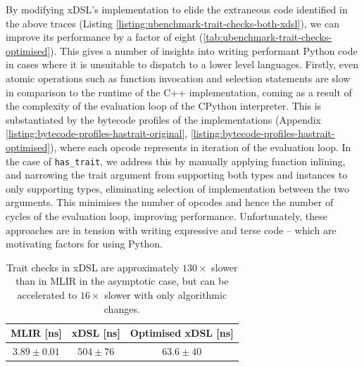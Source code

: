 By modifying xDSL's implementation to elide the extraneous code identified in the above traces (Listing \ref{listing:ubenchmark-trait-checks-both-xdsl}), we can improve its performance by a factor of eight (\autoref{tab:ubenchmark-trait-checks-optimised}).
This gives a number of insights into writing performant Python code in cases where it is unsuitable to dispatch to a lower level languages.
Firstly, even atomic operations such as function invocation and selection statements are slow in comparison to the runtime of the C++ implementation, coming as a result of the complexity of the evaluation loop of the CPython interpreter. %
This is substantiated by the bytecode profiles of the implementations (Appendix \ref{listing:bytecode-profiles-hastrait-original}, \ref{listing:bytecode-profiles-hastrait-optimised}), where each opcode represents in iteration of the evaluation loop.
In the case of \texttt{has_trait}, we address this by manually applying function inlining, and narrowing the trait argument from supporting both types and instances to only supporting types, eliminating selection of implementation between the two arguments. This minimises the number of opcodes and hence the number of cycles of the evaluation loop, improving performance.
Unfortunately, these approaches are in tension with writing expressive and terse code -- which are motivating factors for using Python.



\begin{table}[H]
  \caption{Trait checks in xDSL are approximately $130\times$ slower than in MLIR in the asymptotic case, but can be accelerated to $16\times$ slower with only algorithmic changes.} %
  \label{tab:ubenchmark-trait-checks-optimised}
  \centering
  \begin{tabular}{ccc}
    \toprule
    \textbf{MLIR [ns]} & \textbf{xDSL [ns]} & \textbf{Optimised xDSL [ns]} \\
    \midrule
    $3.89 \pm 0.01$ & $504 \pm 76$ & $63.6 \pm 40$\\
    \bottomrule
  \end{tabular}
\end{table}



